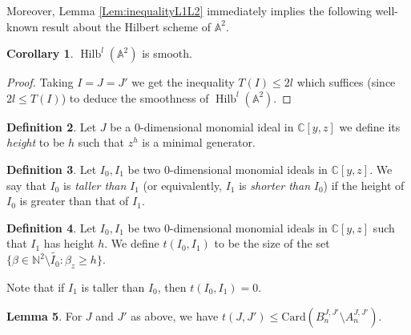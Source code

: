 \documentclass[11pt,a4paper,leqno,noamsfonts]{amsart}
\numberwithin{equation}{section}
\newcommand{\BA}{{\mathbb{A}}}
\newcommand{\BC}{{\mathbb{C}}}
\DeclareMathOperator{\Hilb}{Hilb}
\theoremstyle{definition}
\newtheorem{definition}{Definition}[section]
\theoremstyle{thm}
\newtheorem{corollary}[definition]{Corollary}
\newtheorem{lemma}[definition]{Lemma}
\theoremstyle{ex}
\theoremstyle{sol}
\begin{document}
Moreover, Lemma \ref{Lem:inequalityL1L2} immediately implies the following well-known result about the Hilbert scheme of $\BA^2$.
\begin{corollary}
     $\Hilb^l(\mathbb{A}^2)$ is smooth.
\end{corollary}
\begin{proof}
    Taking $I=J=J'$ we get the inequality $T(I)\leq 2l$ which suffices (since $2l \leq T(I)$) to deduce the smoothness of $\Hilb^l(\mathbb{A}^2)$.
\end{proof}
\begin{definition}
    Let $J$ be a $0$-dimensional monomial ideal in $\BC[y,z]$ we define its \emph{height} to be $h$ such that $z^h$ is a minimal generator.
\end{definition}
\begin{definition}
    Let $I_0,I_1$ be two $0$-dimensional monomial ideals in $\BC[y,z]$. We say that $I_0$ is \emph{taller than} $I_1$ (or equivalently, $I_1$ is \emph{shorter than} $I_0$) if the height of $I_0$ is greater than that of $I_1$.
\end{definition}

\begin{definition} Let $I_0,I_1$ be two $0$-dimensional  monomial ideals in $\BC[y,z]$ such that $I_1$ has height $h$. We define $t(I_0,I_1)$ to be the size of the set $\{\beta\in\mathbb{N}^2\setminus\tilde{I_0}:\beta_z\geq h\}$.

    Note that if $I_1$ is taller than $I_0$, then $t(I_0,I_1)=0$.
\end{definition}
 




\begin{lemma}\label{Cor:tLessGhost}
 For $J$ and $J'$ as above, we have $t(J,J') \leq \mathrm{Card}(B^{J,J'}_n\setminus A^{J,J'}_n)$.
\end{lemma}
\end{document}
